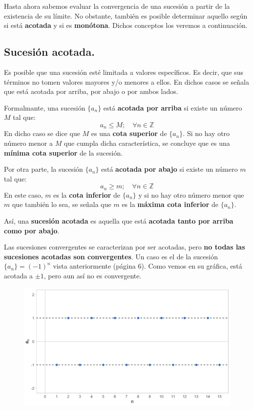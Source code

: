 \documentclass[12pt]{article}
\begin{document}
Hasta ahora sabemos evaluar la convergencia de una sucesión a partir de la existencia de su límite. No obstante, también es posible determinar aquello según si está \textbf{acotada} y si es \textbf{monótona}. Dichos conceptos los veremos a continuación.

\subsection{Sucesión acotada.}

Es posible que una sucesión esté limitada a valores específicos. Es decir, que sus términos no tomen valores mayores y/o menores a ellos. En dichos casos se señala que está acotada por arriba, por abajo o por ambos lados.

Formalmante, una sucesión $\{a_{n}\}$ está \textbf{acotada por arriba} si existe un número $M$ tal que:
\[
  a_{n} \leq M; \quad \forall n \in \mathbb{Z}
\]
En dicho caso se dice que $M$ es una \textbf{cota superior} de $\{a_{n}\}$. Si no hay otro número menor a $M$ que cumpla dicha característica, se concluye que es una \textbf{mínima cota superior} de la sucesión.

Por otra parte, la sucesión $\{a_{n}\}$ está \textbf{acotada por abajo} si existe un número $m$ tal que:
\[
  a_{n} \geq m; \quad \forall n \in \mathbb{Z}
\]
En este caso, $m$ es la \textbf{cota inferior} de $\{a_{n}\}$ y si no hay otro número menor que $m$ que también lo sea, se señala que $m$ es la \textbf{máxima cota inferior} de $\{a_{n}\}$.

Así, una \textbf{sucesión acotada} es aquella que está \textbf{acotada tanto por arriba como por abajo}.

Las sucesiones convergentes se caracterizan por ser acotadas, pero \textbf{no todas las sucesiones acotadas son convergentes}. Un caso es el de la sucesión $\{a_{n}\} = (-1)^{n}$ vista anteriormente (página 6). Como vemos en su gráfica, está acotada a $\pm 1$, pero aun así no es convergente.

\begin{figure}[hbt!]
\centering
\includegraphics[scale = 0.7]{bounded-not-convergent-plot.jpg}
\end{figure}
\end{document}
